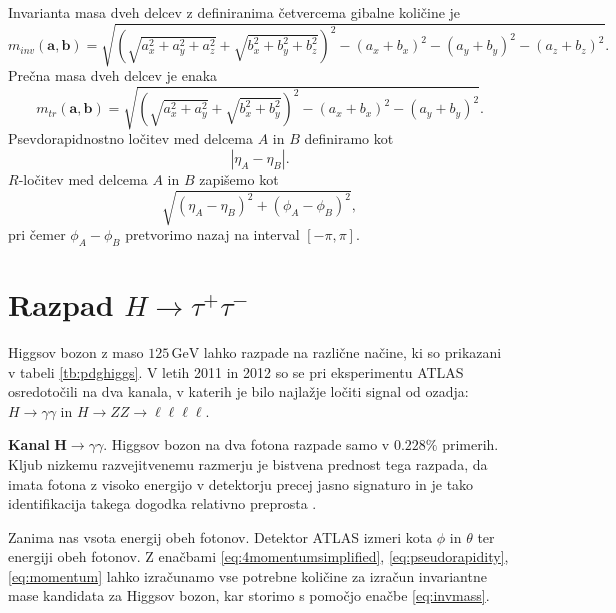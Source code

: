 \documentclass[11pt,a4paper,openany]{book}
\begin{document}
\noindent Invarianta masa dveh delcev z definiranima četvercema gibalne količine je
\begin{equation}
m_{inv}(\mathbf{a}, \mathbf{b}) =
\sqrt{
	\left(
	\sqrt{a_x^2 + a_y^2 + a_z^2} + \sqrt{b_x^2 + b_y^2 + b_z^2}
	\right)^2
	- (a_x + b_x)^2
	- (a_y + b_y)^2
	- (a_z + b_z)^2
}.
\label{eq:invmass}
\end{equation}
Prečna masa dveh delcev je enaka
\begin{equation}
m_{tr}(\mathbf{a}, \mathbf{b}) =
\sqrt{
	\left(
	\sqrt{a_x^2 + a_y^2} + \sqrt{b_x^2 + b_y^2}
	\right)^2
	- (a_x + b_x)^2
	- (a_y + b_y)^2
}.	
\label{eq:invmasstransverse}
\end{equation}
Psevdorapidnostno ločitev med delcema $A$ in $B$ definiramo kot
\begin{equation}
|\eta_A - \eta_B|.
\label{eq:pseudorapidityseparation}
\end{equation}
$R$-ločitev med delcema $A$ in $B$ zapišemo kot
\begin{equation}
\sqrt{(\eta_A - \eta_B)^2 + (\phi_A - \phi_B)^2},
\label{eq:rseparation}
\end{equation}
pri čemer $\phi_A - \phi_B$ pretvorimo nazaj na interval $[-\pi, \pi]$. 

\section{Razpad $H \rightarrow \tau^+\tau^-$}

Higgsov bozon z maso $125\,\text{GeV}$ lahko razpade na različne načine, ki so prikazani v tabeli \ref{tb:pdghiggs}. V letih 2011 in 2012 so se pri eksperimentu ATLAS osredotočili na dva kanala, v katerih je bilo najlažje ločiti signal od ozadja: $H \rightarrow \gamma\gamma$ in $H \rightarrow ZZ \rightarrow \ell\ell\ell\ell$. 

\textbf{Kanal} ${\mathbf H \rightarrow \gamma\gamma}$. Higgsov bozon na dva fotona razpade samo v $\num{0,228}\%$ primerih. Kljub nizkemu razvejitvenemu razmerju je bistvena prednost tega razpada, da imata fotona z visoko energijo v detektorju precej jasno signaturo in je tako identifikacija takega dogodka relativno preprosta \cite{AadScience2012}.

Zanima nas vsota energij obeh fotonov. Detektor ATLAS izmeri kota $\phi$ in $\theta$ ter energiji obeh fotonov. Z enačbami  \ref{eq:4momentumsimplified}, \ref{eq:pseudorapidity}, \ref{eq:momentum} lahko izračunamo vse potrebne količine za izračun invariantne mase kandidata za Higgsov bozon, kar storimo s pomočjo enačbe \ref{eq:invmass}.
\end{document}
